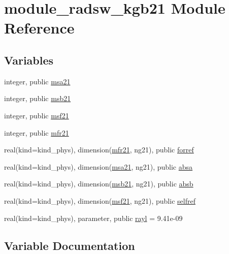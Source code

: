 \hypertarget{namespacemodule__radsw__kgb21}{}\section{module\+\_\+radsw\+\_\+kgb21 Module Reference}
\label{namespacemodule__radsw__kgb21}
\subsection*{Variables}
\begin{DoxyCompactItemize}
\item 
integer, public \hyperlink{namespacemodule__radsw__kgb21_a235b17e9b4b37668028c572f80e1188a}{msa21}
\item 
integer, public \hyperlink{group__module__radsw__main_ga59710ca5b31c30385ea968c0f01e2e81}{msb21}
\item 
integer, public \hyperlink{group__module__radsw__main_gae70b5abfa847419cbf189d2502c34ddd}{msf21}
\item 
integer, public \hyperlink{group__module__radsw__main_ga5575239aa9d55abcca1ac1f82dc4c4ec}{mfr21}
\item 
real(kind=kind\+\_\+phys), dimension(\hyperlink{group__module__radsw__main_ga5575239aa9d55abcca1ac1f82dc4c4ec}{mfr21}, ng21), public \hyperlink{group__module__radsw__main_gac93d473e0309275f03a89b161377a034}{forref}
\item 
real(kind=kind\+\_\+phys), dimension(\hyperlink{namespacemodule__radsw__kgb21_a235b17e9b4b37668028c572f80e1188a}{msa21}, ng21), public \hyperlink{group__module__radsw__main_ga7cce83c282d3efec6a3fe319480c270a}{absa}
\item 
real(kind=kind\+\_\+phys), dimension(\hyperlink{group__module__radsw__main_ga59710ca5b31c30385ea968c0f01e2e81}{msb21}, ng21), public \hyperlink{group__module__radsw__main_ga1d3f12f050c90be49f109205c463b29b}{absb}
\item 
real(kind=kind\+\_\+phys), dimension(\hyperlink{group__module__radsw__main_gae70b5abfa847419cbf189d2502c34ddd}{msf21}, ng21), public \hyperlink{group__module__radsw__main_ga76fc3e4566fcee982b99b10ea562ba93}{selfref}
\item 
real(kind=kind\+\_\+phys), parameter, public \hyperlink{group__module__radsw__main_ga8df418599fb8aef5fc8f2935a913b361}{rayl} = 9.\+41e-\/09
\end{DoxyCompactItemize}


\subsection{Variable Documentation}
